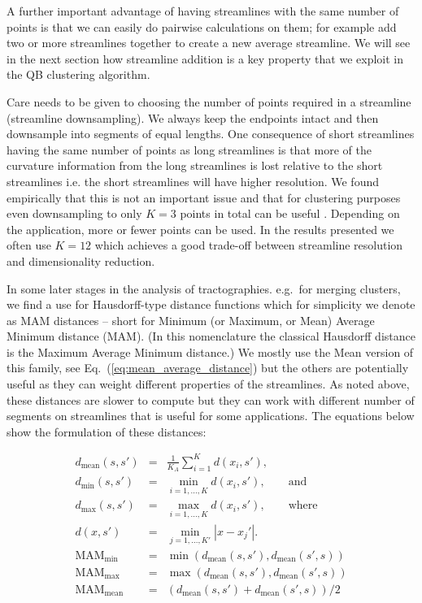 \documentclass{bioinfo}
\begin{document}
\begin{methods}
A further important advantage of having streamlines with the same number
of points is that we can easily do pairwise calculations on them; for
example add two or more streamlines together to create a new average
streamline. We will see in the next section how streamline addition is a
key property that we exploit in the QB clustering algorithm.

Care needs to be given to choosing the number of points required in a
streamline (streamline downsampling). We always keep the endpoints
intact and then downsample into segments of equal lengths. One
consequence of short streamlines having the same number of points as
long streamlines is that more of the curvature information from the long
streamlines is lost relative to the short streamlines i.e. the short
streamlines will have higher resolution.  We found empirically that this
is not an important issue and that for clustering purposes even
downsampling to only $K=3$ points in total can be useful
\citep{EGMB10}. Depending on the application, more or fewer points can
be used. In the results presented we often use $K=12$ which achieves a
good trade-off between streamline resolution and dimensionality
reduction.

In some later stages in the analysis of tractographies. e.g.~for merging
clusters, we find a use for Hausdorff-type distance functions which for
simplicity we denote as MAM distances -- short for Minimum (or Maximum,
or Mean) Average Minimum distance (MAM). (In this nomenclature the
classical Hausdorff distance is the Maximum Average Minimum distance.)
We mostly use the Mean version of this family, see
Eq.~(\ref{eq:mean_average_distance}) but the others are potentially
useful as they can weight different properties of the streamlines. As
noted above, these distances are slower to compute but they can work
with different number of segments on streamlines that is useful for some
applications. The equations below show the formulation of these
distances:

\begin{eqnarray}
d_{\textrm{mean}}(s,s') & = & \frac{1}{K_{A}}\sum_{i=1}^{K}d(x_{i},s'),\nonumber \\
d_{\textrm{min}}(s,s') & = & \min_{i=1,...,K}d(x_{i},s'),\qquad\textrm{and}\label{eq:minimum_distance}\\
d_{\textrm{max}}(s,s') & = & \max_{i=1,...,K }d(x_{i},s'),\qquad\textrm{where}\label{eq:maximum distance}\\
d(x,s') & = & \min_{j=1,...,K'}|x-x_{j}'|.\nonumber \\
\textrm{MAM}_{\textrm{min}} & = & \min(d_{\textrm{mean}}(s,s'),d_{\textrm{mean}}(s',s))\label{eq:min_average_distance}\\
\textrm{MAM}_{\textrm{max}} & = & \max(d_{\textrm{mean}}(s,s'),d_{\textrm{mean}}(s',s))\nonumber \\
\textrm{MAM}_{\textrm{mean}} & = & (d_{\textrm{mean}}(s,s')+d_{\textrm{mean}}(s',s))/2\label{eq:mean_average_distance}\end{eqnarray}



\end{methods}
\end{document}
